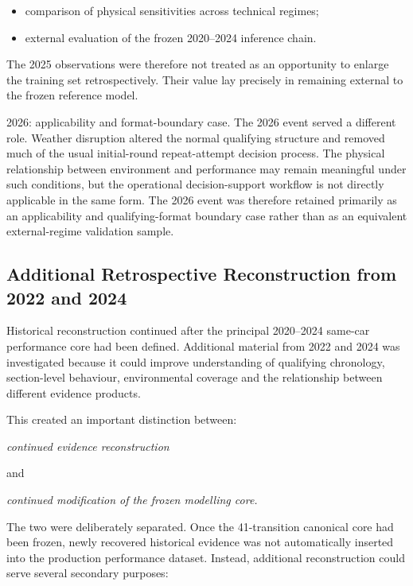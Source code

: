 \begin{itemize}
\item comparison of physical sensitivities across technical regimes;
\item external evaluation of the frozen 2020--2024 inference chain.
\end{itemize}

The 2025 observations were therefore not treated as an opportunity to enlarge the training set retrospectively. Their value lay precisely in remaining external to the frozen reference model.

2026: applicability and format-boundary case. The 2026 event served a different role. Weather disruption altered the normal qualifying structure and removed much of the usual initial-round repeat-attempt decision process. The physical relationship between environment and performance may remain meaningful under such conditions, but the operational decision-support workflow is not directly applicable in the same form. The 2026 event was therefore retained primarily as an applicability and qualifying-format boundary case rather than as an equivalent external-regime validation sample.

\subsection{Additional Retrospective Reconstruction from 2022 and 2024}
Historical reconstruction continued after the principal 2020--2024 same-car performance core had been defined. Additional material from 2022 and 2024 was investigated because it could improve understanding of qualifying chronology, section-level behaviour, environmental coverage and the relationship between different evidence products.

This created an important distinction between:

\begin{center}\textit{continued evidence reconstruction}\end{center}

and

\begin{center}\textit{continued modification of the frozen modelling core.}\end{center}

The two were deliberately separated. Once the 41-transition canonical core had been frozen, newly recovered historical evidence was not automatically inserted into the production performance dataset. Instead, additional reconstruction could serve several secondary purposes:

